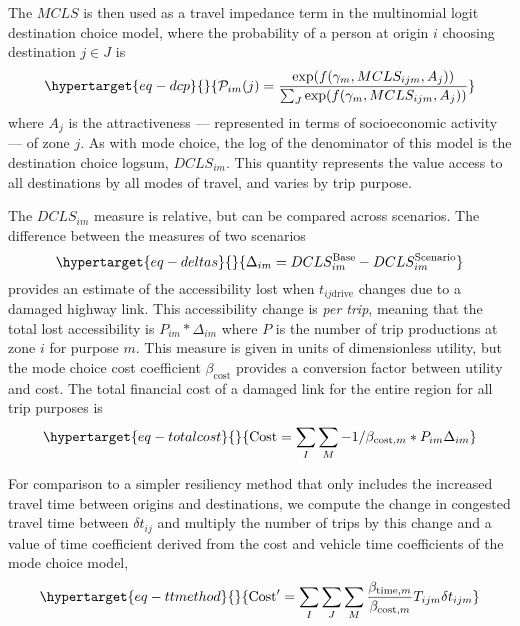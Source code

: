 \documentclass[]{ascelike-new}
\begin{document}
The \(MCLS\) is then used as a travel impedance term in the multinomial
logit destination choice model, where the probability of a person at
origin \(i\) choosing destination \(j \in J\) is
\begin{equation}\protect\hypertarget{eq-dcp}{}{
\mathcal{P}_{im}(j) = \frac{\exp(f(\gamma_{m}, MCLS_{ijm}, A_j))}{\sum_{J}\exp(f(\gamma_{m}, MCLS_{ijm}, A_j))}
}\label{eq-dcp}\end{equation} where \(A_j\) is the attractiveness ---
represented in terms of socioeconomic activity --- of zone \(j\). As
with mode choice, the log of the denominator of this model is the
destination choice logsum, \(DCLS_{im}\). This quantity represents the
value access to all destinations by all modes of travel, and varies by
trip purpose.

The \(DCLS_{im}\) measure is relative, but can be compared across
scenarios. The difference between the measures of two scenarios
\begin{equation}\protect\hypertarget{eq-deltas}{}{
\Delta_{im} = DCLS_{im}^{\mathrm{Base}} - DCLS_{im}^{\mathrm{Scenario}}
}\label{eq-deltas}\end{equation} provides an estimate of the
accessibility lost when \(t_{ij\mathrm{drive}}\) changes due to a
damaged highway link. This accessibility change is \emph{per trip},
meaning that the total lost accessibility is \(P_{im} * \Delta_{im}\)
where \(P\) is the number of trip productions at zone \(i\) for purpose
\(m\). This measure is given in units of dimensionless utility, but the
mode choice cost coefficient \(\beta_{\mathrm{cost}}\) provides a
conversion factor between utility and cost. The total financial cost of
a damaged link for the entire region for all trip purposes is
\begin{equation}\protect\hypertarget{eq-totalcost}{}{
\mathrm{Cost} = \sum_{I}\sum_{M} -1 / \beta_{\mathrm{cost},m} * P_{im} \Delta_{im}
}\label{eq-totalcost}\end{equation}

For comparison to a simpler resiliency method that only includes the
increased travel time between origins and destinations, we compute the
change in congested travel time between \(\delta t_{ij}\) and multiply
the number of trips by this change and a value of time coefficient
derived from the cost and vehicle time coefficients of the mode choice
model, \begin{equation}\protect\hypertarget{eq-ttmethod}{}{
\mathrm{Cost}' =  \sum_I \sum_J \sum_M \frac{\beta_{\mathrm{time}, m} }{\beta_{\mathrm{cost}, m}} T_{ijm} \delta t_{ijm}
}\label{eq-ttmethod}\end{equation}
\end{document}

